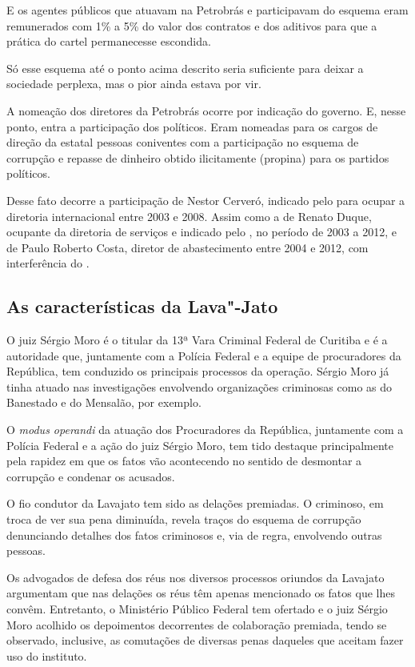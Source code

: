 E os agentes públicos que atuavam na Petrobrás e participavam do
esquema eram remunerados com 1\% a 5\% do valor dos contratos e dos
aditivos para que a prática do cartel permanecesse escondida.

Só esse esquema até o ponto acima descrito seria suficiente para deixar
a sociedade perplexa, mas o pior ainda estava por vir.

A nomeação dos diretores da Petrobrás ocorre por indicação do governo.
E, nesse ponto, entra a participação dos políticos. Eram nomeadas para
os cargos de direção da estatal pessoas coniventes com a participação
no esquema de corrupção e repasse de dinheiro obtido ilicitamente
(propina) para os partidos políticos.

Desse fato decorre a participação de Nestor Cerveró, indicado pelo 
para ocupar a diretoria internacional entre 2003 e 2008. Assim como a
de Renato Duque, ocupante da diretoria de serviços e indicado pelo ,
no período de 2003 a 2012, e de Paulo Roberto Costa, diretor de
abastecimento entre 2004 e 2012, com interferência do .

\subsection{As características da Lava"-Jato}

O juiz Sérgio Moro é o titular da 13ª Vara Criminal Federal de Curitiba
e é a autoridade que, juntamente com a Polícia Federal e a equipe de
procuradores da República, tem conduzido os principais processos da
operação. Sérgio Moro já tinha atuado nas investigações envolvendo
organizações criminosas como as do Banestado e do Mensalão, por exemplo.

O \emph{modus operandi} da atuação dos Procuradores da República,
juntamente com a Polícia Federal e a ação do juiz Sérgio Moro, tem tido
destaque principalmente pela rapidez em que os fatos vão acontecendo no
sentido de desmontar a corrupção e condenar os acusados.

O fio condutor da Lavajato tem sido as delações premiadas. O criminoso,
em troca de ver sua pena diminuída, revela traços do esquema de
corrupção denunciando detalhes dos fatos criminosos e, via de regra,
envolvendo outras pessoas.

Os advogados de defesa dos réus nos diversos processos oriundos da
Lavajato argumentam que nas delações os réus têm apenas mencionado os
fatos que lhes convêm. Entretanto, o Ministério Público Federal tem
ofertado e o juiz Sérgio Moro acolhido os depoimentos decorrentes de
colaboração premiada, tendo se observado, inclusive, as comutações de
diversas penas daqueles que aceitam fazer uso do instituto.

